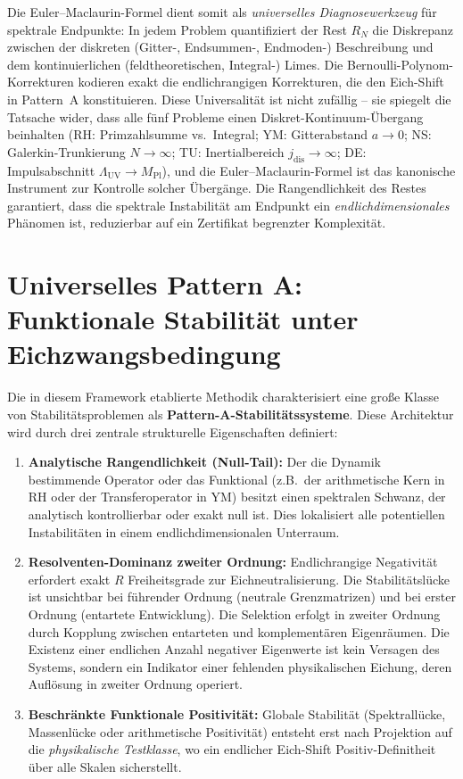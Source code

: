 \documentclass[12pt,a4paper]{article}
\theoremstyle{definition}
\theoremstyle{remark}
\begin{document}
\noindent
Die Euler--Maclaurin-Formel dient somit als \emph{universelles Diagnosewerkzeug}
für spektrale Endpunkte: In jedem Problem quantifiziert der Rest $R_N$ die
Diskrepanz zwischen der diskreten (Gitter-, Endsummen-, Endmoden-)
Beschreibung und dem kontinuierlichen (feldtheoretischen, Integral-) Limes. Die
Bernoulli-Polynom-Korrekturen kodieren exakt die endlichrangigen Korrekturen,
die den Eich-Shift in Pattern~A konstituieren. Diese Universalität ist nicht
zufällig -- sie spiegelt die Tatsache wider, dass alle fünf Probleme einen
Diskret-Kontinuum-Übergang beinhalten (RH: Primzahlsumme vs.\ Integral;
YM: Gitterabstand $a \to 0$; NS: Galerkin-Trunkierung $N \to \infty$;
TU: Inertialbereich $j_{\mathrm{dis}} \to \infty$;
DE: Impulsabschnitt $\Lambda_{\mathrm{UV}} \to M_{\mathrm{Pl}}$),
und die Euler--Maclaurin-Formel ist das kanonische Instrument zur
Kontrolle solcher Übergänge. Die Rangendlichkeit des Restes
garantiert, dass die spektrale Instabilität am Endpunkt ein
\emph{endlichdimensionales} Phänomen ist, reduzierbar auf ein Zertifikat
begrenzter Komplexität.

\section{Universelles Pattern A: Funktionale Stabilität unter Eichzwangsbedingung}
\label{sec:pattern-a}

Die in diesem Framework etablierte Methodik charakterisiert eine große Klasse von Stabilitätsproblemen als \textbf{Pattern-A-Stabilitätssysteme}. Diese Architektur wird durch drei zentrale strukturelle Eigenschaften definiert:

\begin{enumerate}[label=\alph*)]
    \item \textbf{Analytische Rangendlichkeit (Null-Tail):} Der die Dynamik bestimmende Operator oder das Funktional (z.B.\ der arithmetische Kern in RH oder der Transferoperator in YM) besitzt einen spektralen Schwanz, der analytisch kontrollierbar oder exakt null ist. Dies lokalisiert alle potentiellen Instabilitäten in einem endlichdimensionalen Unterraum.
    \item \textbf{Resolventen-Dominanz zweiter Ordnung:} Endlichrangige Negativität erfordert exakt $R$ Freiheitsgrade zur Eichneutralisierung. Die Stabilitätslücke ist unsichtbar bei führender Ordnung (neutrale Grenzmatrizen) und bei erster Ordnung (entartete Entwicklung). Die Selektion erfolgt in zweiter Ordnung durch Kopplung zwischen entarteten und komplementären Eigenräumen. Die Existenz einer endlichen Anzahl negativer Eigenwerte ist kein Versagen des Systems, sondern ein Indikator einer fehlenden physikalischen Eichung, deren Auflösung in zweiter Ordnung operiert.
    \item \textbf{Beschränkte Funktionale Positivität:} Globale Stabilität (Spektrallücke, Massenlücke oder arithmetische Positivität) entsteht erst nach Projektion auf die \emph{physikalische Testklasse}, wo ein endlicher Eich-Shift Positiv-Definitheit über alle Skalen sicherstellt.
\end{enumerate}
\end{document}
